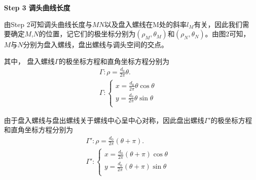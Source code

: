 \documentclass[../main.tex]{subfiles}
\begin{document}
\noindent\textbf{Step 3 调头曲线长度} 
\par 由Step 2可知调头曲线长度与$MN$以及盘入螺线在M处的斜率$l_M$有关，因此我们需要确定$M$,$N$的位置，记它们的极坐标分别为$(\rho_M,\theta_M)$和$(\rho_N,\theta_N)$。由图2可知，$M$与$N$分别为盘入螺线，盘出螺线与调头空间的交点。
\par 其中， 盘入螺线\(\varGamma\)的极坐标方程和直角坐标方程分别为
\begin{gather}
    \varGamma :\rho =\frac{d_0}{2\pi}\theta.\label{7.3.1}
    \\
    \varGamma :\begin{cases}\label{7.4.1}
        x=\frac{d_0}{2\pi}\theta \cos \theta\\
        y=\frac{d_0}{2\pi}\theta \sin \theta\\
        \end{cases}
    \end{gather}
   
    \par 由于盘入螺线与盘出螺线关于螺线中心呈中心对称，因此盘出螺线$\varGamma'$的极坐标方程和直角坐标方程分别为
    \begin{gather}
        \varGamma':\rho =\frac{d_0}{2\pi}\left( \theta +\pi \right) .\label{7.3.2}  \\
        \varGamma':\begin{cases}\label{7.4.2}
            x=\frac{d_0}{2\pi}\left( \theta +\pi \right) \cos \theta\\
            y=\frac{d_0}{2\pi}\left( \theta +\pi \right) \sin \theta\\
            \end{cases}
        \end{gather}
    
\end{document}
